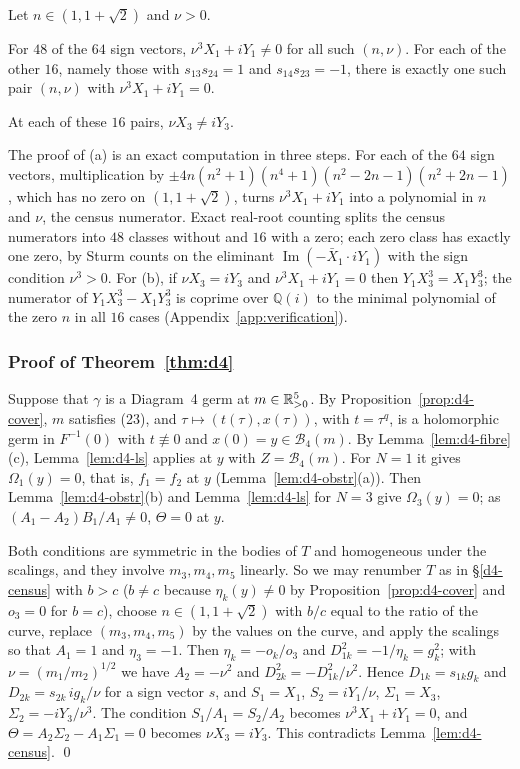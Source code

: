 \begin{lemma}\label{lem:d4-census}
Let $n\in(1,1+\sqrt2)$ and $\nu>0$.
\begin{alphalist}
  \item For $48$ of the $64$ sign vectors, $\nu^3X_1+iY_1\ne0$ for all such $(n,\nu)$.  For
  each of the other $16$, namely those with $s_{13}s_{24}=1$ and $s_{14}s_{23}=-1$, there is
  exactly one such pair $(n,\nu)$ with $\nu^3X_1+iY_1=0$.
  \item At each of these $16$ pairs, $\nu X_3\ne iY_3$.
\end{alphalist}
\end{lemma}
The proof of (a) is an exact computation in three steps.  For each of the $64$ sign vectors,
multiplication by $\pm4n(n^2+1)(n^4+1)(n^2-2n-1)(n^2+2n-1)$, which has no zero on
$(1,1+\sqrt2)$, turns $\nu^3X_1+iY_1$ into a polynomial in $n$ and $\nu$, the census numerator.
Exact real-root counting splits the census numerators into $48$ classes without and $16$ with a
zero; each zero class has exactly one zero, by Sturm counts on the eliminant
$\operatorname{Im}(-\bar X_1\cdot iY_1)$ with the sign condition $\nu^3>0$.
For (b), if $\nu X_3=iY_3$ and $\nu^3X_1+iY_1=0$ then $Y_1X_3^3=X_1Y_3^3$; the numerator of
$Y_1X_3^3-X_1Y_3^3$ is coprime over $\mathbb Q(i)$ to the minimal polynomial of the zero $n$ in
all $16$ cases (Appendix~\ref{app:verification}).

\subsubsection{Proof of Theorem~\ref{thm:d4}}
Suppose that $\gamma$ is a Diagram~4 germ at $m\in\mathbb{R}_{>0}^5$.  By Proposition~\ref{prop:d4-cover},
$m$ satisfies (23), and $\tau\mapsto(t(\tau),x(\tau))$, with $t=\tau^q$, is a holomorphic germ in
$F^{-1}(0)$ with $t\not\equiv0$ and $x(0)=y\in\mathcal B_4(m)$.  By Lemma~\ref{lem:d4-fibre}(c),
Lemma~\ref{lem:d4-ls} applies at $y$ with $Z=\mathcal B_4(m)$.  For $N=1$ it gives
$\Omega_1(y)=0$, that is, $f_1=f_2$ at $y$ (Lemma~\ref{lem:d4-obstr}(a)).  Then
Lemma~\ref{lem:d4-obstr}(b) and Lemma~\ref{lem:d4-ls} for $N=3$ give $\Omega_3(y)=0$; as
$(A_1-A_2)B_1/A_1\ne0$, $\Theta=0$ at $y$.

Both conditions are symmetric in the bodies of $T$ and homogeneous under the scalings, and they
involve $m_3,m_4,m_5$ linearly.  So we may renumber $T$ as in \S\ref{d4-census} with $b>c$
($b\ne c$ because $\eta_k(y)\ne0$ by Proposition~\ref{prop:d4-cover} and $o_3=0$ for $b=c$),
choose $n\in(1,1+\sqrt2)$ with $b/c$ equal to the ratio of the curve, replace $(m_3,m_4,m_5)$ by
the values on the curve, and apply the scalings so that $A_1=1$ and $\eta_3=-1$.  Then
$\eta_k=-o_k/o_3$ and $D_{1k}^2=-1/\eta_k=g_k^2$; with $\nu=(m_1/m_2)^{1/2}$ we have $A_2=-\nu^2$ and
$D_{2k}^2=-D_{1k}^2/\nu^2$.  Hence $D_{1k}=s_{1k}g_k$ and $D_{2k}=s_{2k}\,ig_k/\nu$ for a sign
vector $s$, and $S_1=X_1$, $S_2=iY_1/\nu$, $\Sigma_1=X_3$, $\Sigma_2=-iY_3/\nu^3$.  The condition
$S_1/A_1=S_2/A_2$ becomes $\nu^3X_1+iY_1=0$, and $\Theta=A_2\Sigma_2-A_1\Sigma_1=0$ becomes
$\nu X_3=iY_3$.  This contradicts Lemma~\ref{lem:d4-census}. \qed

